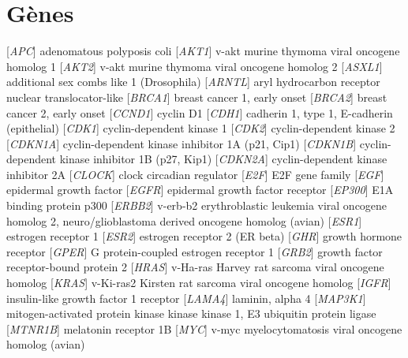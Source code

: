 	\section{\textcolor{white!15!black}{Gènes}}\label{app:ac:gènes}
		\begin{acronym}[CDKN2A]
					[\emph{APC}]	{adenomatous polyposis coli}
					[\emph{AKT1}]	{v-akt murine thymoma viral oncogene homolog 1}
					[\emph{AKT2}]	{v-akt murine thymoma viral oncogene homolog 2}
					[\emph{ASXL1}]	{additional sex combs like 1 (Drosophila)}
					[\emph{ARNTL}]	{aryl hydrocarbon receptor nuclear translocator-like}
					[\emph{BRCA1}]	{breast cancer 1, early onset}
					[\emph{BRCA2}]	{breast cancer 2, early onset}
					[\emph{CCND1}]	{cyclin D1}
					[\emph{CDH1}]	{cadherin 1, type 1, E-cadherin (epithelial)}
					[\emph{CDK1}]	{cyclin-dependent kinase 1}
					[\emph{CDK2}]	{cyclin-dependent kinase 2}
				[\emph{CDKN1A}]	{cyclin-dependent kinase inhibitor 1A (p21, Cip1)}
				[\emph{CDKN1B}]	{cyclin-dependent kinase inhibitor 1B (p27, Kip1)}
				[\emph{CDKN2A}]	{cyclin-dependent kinase inhibitor 2A}
					[\emph{CLOCK}]	{clock circadian regulator}
					[\emph{E2F}]	{E2F gene family}
					[\emph{EGF}]	{epidermal growth factor}
					[\emph{EGFR}]	{epidermal growth factor receptor}
					[\emph{EP300}]	{E1A binding protein p300}
					[\emph{ERBB2}]	{v-erb-b2 erythroblastic leukemia viral oncogene homolog 2, neuro/glioblastoma derived oncogene homolog (avian)}
					[\emph{ESR1}]	{estrogen receptor 1}
					[\emph{ESR2}]	{estrogen receptor 2 (ER beta)}
					[\emph{GHR}]	{growth hormone receptor}
					[\emph{GPER}]	{G protein-coupled estrogen receptor 1}
					[\emph{GRB2}]	{growth factor receptor-bound protein 2}
					[\emph{HRAS}]	{v-Ha-ras Harvey rat sarcoma viral oncogene homolog}
					[\emph{KRAS}]	{v-Ki-ras2 Kirsten rat sarcoma viral oncogene homolog}
					[\emph{IGFR}]	{insulin-like growth factor 1 receptor}
					[\emph{LAMA4}]	{laminin, alpha 4}
				[\emph{MAP3K1}]	{mitogen-activated protein kinase kinase kinase 1, E3 ubiquitin protein ligase}
				[\emph{MTNR1B}]	{melatonin receptor 1B}
					[\emph{MYC}]	{v-myc myelocytomatosis viral oncogene homolog (avian)}

\end{acronym}
